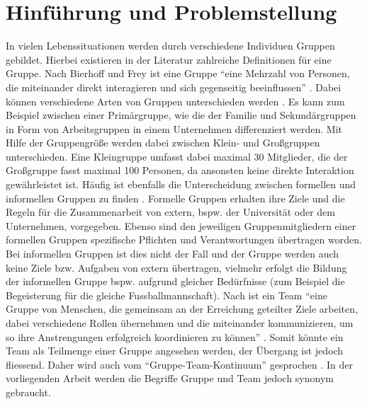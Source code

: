 \chapter{Hinführung und Problemstellung}
\label{kap1_hinfuehrung_problemstellung}

In vielen Lebenssituationen werden durch verschiedene Individuen Gruppen gebildet. Hierbei existieren in der Literatur zahlreiche Definitionen für eine Gruppe. Nach Bierhoff und Frey ist eine Gruppe “eine Mehrzahl von Personen, die miteinander direkt interagieren und sich gegenseitig beeinflussen”  \citep[S.~638]{bierhoff_handbuch_2006}.
\newline\newline
Dabei können verschiedene Arten von Gruppen unterschieden werden \citep[Vgl. zum folgenden Abschnitt][S.~11ff.]{thomas_grundris_1991}. Es kann zum Beispiel zwischen einer Primärgruppe, wie die der Familie und Sekundärgruppen in Form von Arbeitsgruppen in einem Unternehmen differenziert werden. Mit Hilfe der Gruppengröße werden dabei zwischen Klein- und Großgruppen unterschieden. Eine Kleingruppe umfasst dabei maximal 30 Mitglieder, die der Großgruppe fasst maximal 100 Personen, da ansonsten keine direkte Interaktion gewährleistet ist.
\newline\newline 
Häufig ist ebenfalls die Unterscheidung zwischen formellen und informellen Gruppen zu finden \citep[Vgl. zum folgenden Abschnitt][S.~48]{spies_organisationspsychologie_2010}.
Formelle Gruppen erhalten ihre Ziele und die Regeln für die Zusammenarbeit von extern, bspw. der Universität oder dem Unternehmen, vorgegeben. Ebenso sind den jeweiligen Gruppenmitgliedern einer formellen Gruppen spezifische Pflichten und Verantwortungen übertragen worden. Bei informellen Gruppen ist dies nicht der Fall und der Gruppe werden auch keine Ziele bzw. Aufgaben von extern übertragen, vielmehr erfolgt die Bildung der informellen Gruppe bspw. aufgrund gleicher Bedürfnisse (zum Beispiel die Begeisterung für die gleiche Fussballmannschaft). 
\newline\newline
Nach \citet{dick_teamwork_2013} ist ein Team "`eine Gruppe von Menschen, die gemeinsam an der Erreichung geteilter Ziele arbeiten, dabei verschiedene Rollen übernehmen und die miteinander kommunizieren, um so ihre Anstrengungen erfolgreich koordinieren zu können"' \citep[S.~1]{dick_teamwork_2013}. Somit könnte ein Team als Teilmenge einer Gruppe angesehen werden, der Übergang ist jedoch fliessend. Daher wird auch vom "`Gruppe-Team-Kontinuum"' gesprochen \citep[Vgl.][S.~14]{brettel_erfolgreiche_2009}. In der vorliegenden Arbeit werden die Begriffe Gruppe und Team jedoch synonym gebraucht.

